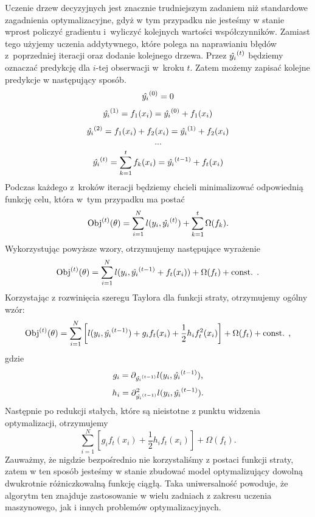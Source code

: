 \documentclass[inzynierska]{pwr_wmat_praca_dyplomowa}
\theoremstyle{plain}
\numberwithin{theorem}{chapter}
\theoremstyle{definition}
\numberwithin{theorem}{chapter}
\begin{document}
Uczenie drzew decyzyjnych jest znacznie trudniejszym zadaniem niż standardowe zagadnienia optymalizacyjne, gdyż w tym przypadku nie jesteśmy w stanie wprost policzyć gradientu i~wyliczyć kolejnych wartości współczynników. Zamiast tego użyjemy uczenia addytywnego, które polega na naprawianiu błędów z~poprzedniej iteracji oraz dodanie kolejnego drzewa. Przez $\hat{y_i}^{(t)}$ będziemy oznaczać predykcję dla $i$-tej obserwacji w~kroku $t$. Zatem możemy zapisać kolejne predykcje w następujący sposób.
$$ \hat{y_i}^{(0)} = 0 $$
$$ \hat{y_i}^{(1)} = f_1(x_i)  = \hat{y_i}^{(0)} + f_1(x_i) $$
$$ \hat{y_i}^{(2)} = f_1(x_i) + f_2(x_i) = \hat{y_i}^{(1)} + f_2(x_i) $$
$$ ... $$
$$ \hat{y_i}^{(t)} = \sum_{k=1}^{t} f_k(x_i) = \hat{y_i}^{(t-1)} + f_t(x_i) $$
Podczas każdego z~kroków iteracji będziemy chcieli minimalizować odpowiednią funkcję celu, która w~tym przypadku ma postać
$$ \text{Obj}^{(t)}(\theta) = \sum_{i=1}^{N} l(y_i, \hat{y_i}^{(t)}) + \sum_{k=1}^{t} \Omega(f_k) \text{.} $$
Wykorzystując powyższe wzory, otrzymujemy następujące wyrażenie
$$ \text{Obj}^{(t)}(\theta) = \sum_{i=1}^{N} l(y_i, \hat{y_i}^{(t-1)} + f_t(x_i)) + \Omega(f_t) + \text{const. .}$$
Korzystając z rozwinięcia szeregu Taylora dla funkcji straty, otrzymujemy ogólny wzór:
$$ \text{Obj}^{(t)}(\theta) = \sum_{i=1}^{N} \left[ l(y_i, \hat{y_i}^{(t-1)}) + g_i f_t(x_i) + \frac{1}{2} h_i f_t^2(x_i) \right] + \Omega(f_t) + \text{const. ,} $$
gdzie 
$$ g_i = \partial_{\hat{y_i}^{(t-1)}} l(y_i, \hat{y_i}^{(t-1)}) \text{,} $$
$$ h_i = \partial^2_{\hat{y_i}^{(t-1)}} l(y_i, \hat{y_i}^{(t-1)}) \text{.}$$
Następnie po redukcji stałych, które są nieistotne z punktu widzenia optymalizacji, otrzymujemy
$$ \sum_{i=1}^{N} [g_i f_t(x_i) + \frac{1}{2} h_i f_t(x_i)] + \Omega(f_t) \text{.}$$
Zauważmy, że nigdzie bezpośrednio nie korzystaliśmy z postaci funkcji straty, zatem w ten sposób jesteśmy w stanie zbudować model optymalizujący dowolną dwukrotnie różniczkowalną funkcję ciągłą. Taka uniwersalność powoduje, że algorytm ten znajduje zastosowanie w wielu zadniach z zakresu uczenia maszynowego, jak i innych problemów optymalizacyjnych.
\end{document}
